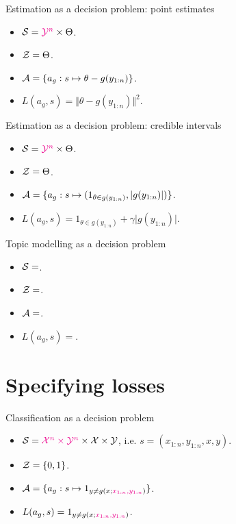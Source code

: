 \documentclass[10pt]{beamer}
\begin{document}
\begin{frame}{Estimation as a decision problem: point estimates}
  \begin{itemize}
    \item $\mathcal{S} = \textcolor{magenta}{\mathcal{Y}^n}\times \Theta$.
    \item $\mathcal{Z} = \Theta$.
    \item $\mathcal{A} = \{a_g: s\mapsto \theta - g(y_{1:n})\}$.
    \item $L(a_g,s) = \Vert \theta - g(y_{1:n}) \Vert^2$.
    \end{itemize}
    \blank
    \vfill
\end{frame}

\begin{frame}{Estimation as a decision problem: credible intervals}
  \begin{itemize}
    \item $\mathcal{S} = \textcolor{magenta}{\mathcal{Y}^n}\times \Theta$.
    \item $\mathcal{Z} = \Theta$.
    \item $\mathcal{A} = \{a_g: s\mapsto (1_{\theta \in g(y_{1:n})}, \vert g(y_{1:n})\vert) \}$.
    \item $L(a_g,s) = 1_{\theta \in g(y_{1:n})} + \gamma \vert g(y_{1:n})\vert$.
    \end{itemize}
    \blank
    \vfill
\end{frame}

\begin{frame}{Topic modelling as a decision problem}
  \begin{itemize}
    \item $\mathcal{S} = $.
    \item $\mathcal{Z} = $.
    \item $\mathcal{A} = $.
    \item $L(a_g,s) = $.
    \end{itemize}
    \blank
    \vfill
  \end{frame}

\section{Specifying losses}

  \begin{frame}{Classification as a decision problem}
  \begin{itemize}
    \item $\mathcal{S} = \textcolor{magenta}{\mathcal{X}^n\times\mathcal{Y}^n}\times \mathcal{X}\times \mathcal{Y}$, i.e. $s = (x_{1:n}, y_{1:n}, x, y)$.
    \item $\mathcal{Z} = \{0,1\}$.
    \item $\mathcal{A} = \{a_g: s\mapsto 1_{y\neq g(x; \textcolor{magenta}{x_{1:n}, y_{1:n}})}\}$.
    \item $L(a_g,s) = 1_{y\neq g(x; \textcolor{magenta}{x_{1:n}, y_{1:n}})}$.
    \end{itemize}
    \blank
    \vfill
\end{frame}
\end{document}
